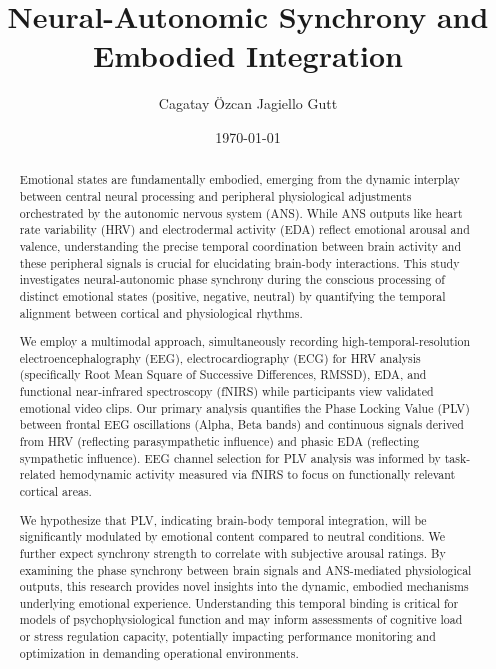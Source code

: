 \documentclass[12pt, a4paper]{article}
\title{Neural-Autonomic Synchrony and Embodied Integration}
\author{Cagatay Özcan Jagiello Gutt}
\date{\today}
\begin{document}
{\bfseries\maketitle}
\thispagestyle{fancy}
\vspace{-2\baselineskip}

\begin{abstract}
Emotional states are fundamentally embodied, emerging from the dynamic interplay between central neural processing and peripheral physiological adjustments orchestrated by the autonomic nervous system (ANS). While ANS outputs like heart rate variability (HRV) and electrodermal activity (EDA) reflect emotional arousal and valence, understanding the precise temporal coordination between brain activity and these peripheral signals is crucial for elucidating brain-body interactions. This study investigates neural-autonomic phase synchrony during the conscious processing of distinct emotional states (positive, negative, neutral) by quantifying the temporal alignment between cortical and physiological rhythms.
    
We employ a multimodal approach, simultaneously recording high-temporal-resolution electroencephalography (EEG), electrocardiography (ECG) for HRV analysis (specifically Root Mean Square of Successive Differences, RMSSD), EDA, and functional near-infrared spectroscopy (fNIRS) while participants view validated emotional video clips. Our primary analysis quantifies the Phase Locking Value (PLV) between frontal EEG oscillations (Alpha, Beta bands) and continuous signals derived from HRV (reflecting parasympathetic influence) and phasic EDA (reflecting sympathetic influence). EEG channel selection for PLV analysis was informed by task-related hemodynamic activity measured via fNIRS to focus on functionally relevant cortical areas.
    
We hypothesize that PLV, indicating brain-body temporal integration, will be significantly modulated by emotional content compared to neutral conditions. We further expect synchrony strength to correlate with subjective arousal ratings. By examining the phase synchrony between brain signals and ANS-mediated physiological outputs, this research provides novel insights into the dynamic, embodied mechanisms underlying emotional experience. Understanding this temporal binding is critical for models of psychophysiological function and may inform assessments of cognitive load or stress regulation capacity, potentially impacting performance monitoring and optimization in demanding operational environments.
\end{abstract}
    
\end{document}
